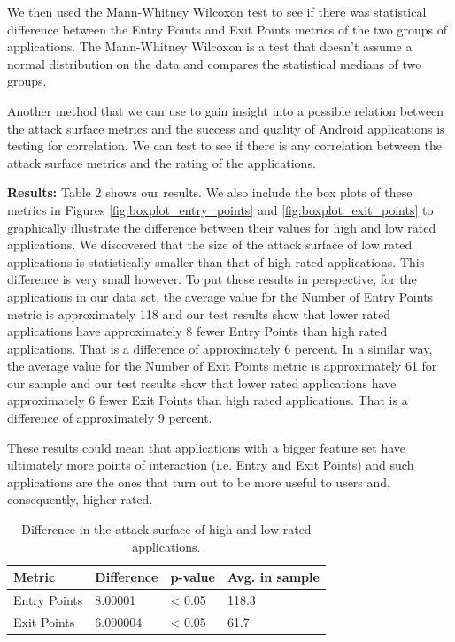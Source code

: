 \documentclass{sig-alternate}
\begin{document}
We then used the Mann-Whitney Wilcoxon test to see if there was statistical difference between the Entry Points and Exit Points metrics of the two groups of applications. The Mann-Whitney Wilcoxon is a test that doesn't assume a normal distribution on the data and compares the statistical medians of two groups.

Another method that we can use to gain insight into a possible relation between the attack surface metrics and the success and quality of Android applications is testing for correlation. We can test to see if there is any correlation between the attack surface metrics and the rating of the applications.

\textbf{Results:} Table 2 shows our results. We also include the box plots of these metrics in Figures \ref{fig:boxplot_entry_points} and \ref{fig:boxplot_exit_points} to graphically illustrate the difference between their values for high and low rated applications. We discovered that the size of the attack surface of low rated applications is statistically smaller than that of high rated applications. This difference is very small however. To put these results in perspective, for the applications in our data set, the average value for the Number of Entry Points metric is approximately 118 and our test results show that lower rated applications have approximately 8 fewer Entry Points than high rated applications. That is a difference of approximately 6 percent. In a similar way, the average value for the Number of Exit Points metric is approximately 61 for our sample and our test results show that lower rated applications have approximately 6 fewer Exit Points than high rated applications. That is a difference of approximately 9 percent.

These results could mean that applications with a bigger feature set have ultimately more points of interaction (i.e. Entry and Exit Points) and such applications are the ones that turn out to be more useful to users and, consequently, higher rated.

\begin{table}
  \centering

  \label{tab:result_rq2}

  \begin{tabular}{|l|l|l|l|}
  \hline
  \textbf{Metric} & \textbf{Difference} & \textbf{p-value} & \textbf{Avg. in sample}\\ 
  \hline
  Entry Points & 8.00001 & < 0.05 & 118.3 \\
  Exit Points & 6.000004 & < 0.05  & 61.7 \\
  \hline
  \end{tabular}

  \caption{Difference in the attack surface of high and low rated applications.}
\end{table}
\end{document}
